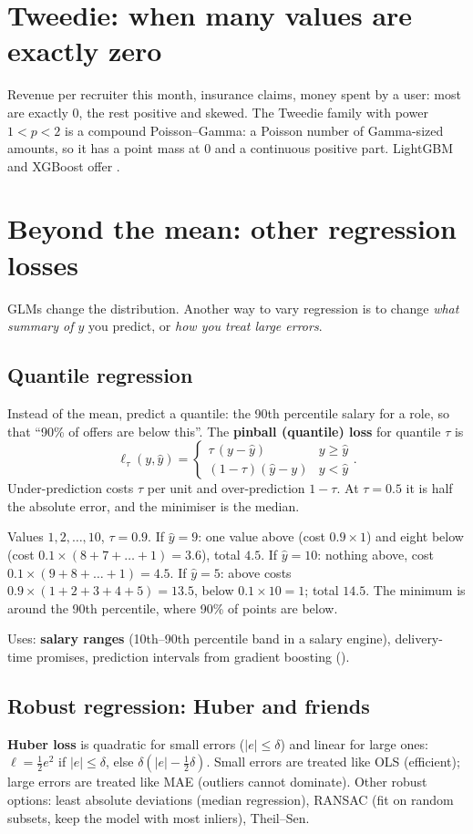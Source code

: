 \section{Tweedie: when many values are exactly zero}
Revenue per recruiter this month, insurance claims, money spent by a user: most are exactly 0, the rest positive and
skewed. The Tweedie family with power $1<p<2$ is a compound Poisson--Gamma: a Poisson number of Gamma-sized amounts, so
it has a point mass at 0 and a continuous positive part. LightGBM and XGBoost offer .

\section{Beyond the mean: other regression losses}

GLMs change the distribution. Another way to vary regression is to change \emph{what summary of $y$} you predict, or
\emph{how you treat large errors}.

\subsection{Quantile regression}
Instead of the mean, predict a quantile: the 90th percentile salary for a role, so that ``90\% of offers are below this''.
The \textbf{pinball (quantile) loss} for quantile $\tau$ is
\[ \ell_\tau(y,\hat y) = \begin{cases}\tau\,(y - \hat y) & y \ge \hat y\\ (1-\tau)(\hat y - y) & y < \hat y\end{cases}. \]
Under-prediction costs $\tau$ per unit and over-prediction $1-\tau$. At $\tau = 0.5$ it is half the absolute error, and
the minimiser is the median.
\begin{example}
Values $1,2,\dots,10$, $\tau = 0.9$. If $\hat y = 9$: one value above (cost $0.9\times1$) and eight below (cost $0.1\times
(8+7+\dots+1) = 3.6$), total $4.5$. If $\hat y = 10$: nothing above, cost $0.1\times(9+8+\dots+1)=4.5$. If $\hat y = 5$:
above costs $0.9\times(1+2+3+4+5) = 13.5$, below $0.1\times10 = 1$; total $14.5$. The minimum is around the 90th
percentile, where 90\% of points are below.
\end{example}
Uses: \textbf{salary ranges} (10th--90th percentile band in a salary engine), delivery-time promises, prediction intervals
from gradient boosting ().

\subsection{Robust regression: Huber and friends}
\textbf{Huber loss} is quadratic for small errors ($|e| \le \delta$) and linear for large ones:
$\ell = \frac12e^2$ if $|e|\le\delta$, else $\delta(|e| - \frac12\delta)$. Small errors are treated like OLS (efficient);
large errors are treated like MAE (outliers cannot dominate). Other robust options: least absolute deviations (median
regression), RANSAC (fit on random subsets, keep the model with most inliers), Theil--Sen.

